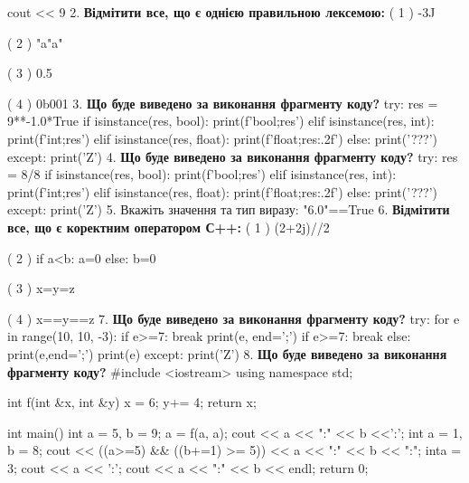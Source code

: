 \documentclass[11pt]{article}
\begin{document}
cout << 9 %
\vspace{5mm}
2. %
\textbf{Відмітити все, що є однією правильною лексемою:}
( 1 ) -3J

( 2 ) "a"a"

( 3 ) 0.5

( 4 ) 0b001
\vspace{5mm}
3. \textbf{Що буде виведено за виконання фрагменту коду?}
try:
    res = 9**-1.0*True
    if isinstance(res, bool):
        print(f'bool;{res}')
    elif isinstance(res, int):
        print(f'int;{res}')
    elif isinstance(res, float):
        print(f'float;{res:.2f}')
    else:
        print('???')
except:
    print('Z')
\vspace{5mm}
4. \textbf{Що буде виведено за виконання фрагменту коду?}
try:
    res = 8/8%
    if isinstance(res, bool):
        print(f'bool;{res}')
    elif isinstance(res, int):
        print(f'int;{res}')
    elif isinstance(res, float):
        print(f'float;{res:.2f}')
    else:
        print('???')
except:
    print('Z')
\vspace{5mm}
5. 
Вкажіть значення та тип виразу:
"6.0"==True
\vspace{5mm}
6. %
\textbf{Відмітити все, що є коректним оператором С++:}
( 1 ) (2+2j)//2

( 2 ) if a<b: a=0 else: b=0

( 3 ) x=y=z

( 4 ) x==y==z
\vspace{5mm}
7. \textbf{Що буде виведено за виконання фрагменту коду?}
try:
    for e in range(10, 10, -3):
        if e>=7:
            break
        print(e, end=';')
        if e>=7:
            break
    else:
        print(e,end=';')
    print(e)
except:
    print('Z')
\vspace{5mm}
8. \textbf{Що буде виведено за виконання фрагменту коду?}
#include <iostream>
using namespace std;

int f(int &x, int &y){
    x = 6;
    y+= 4;
    return x;
}

int main(){
    int a = 5, b = 9;
    a = f(a, a);
    cout << a << ":" << b <<':';
    {
        int a = 1, b = 8;
        cout << ((a>=5) && ((b+=1) >= 5))
             << a << ":" << b << ":";
    }
    {
        inta = 3;
        cout << a << ':';
    }
    cout << a << ":" << b << endl;
    return 0;
}
\end{document}
